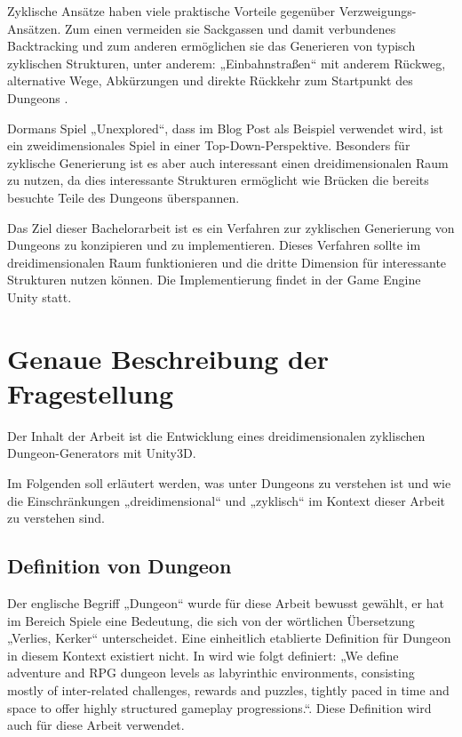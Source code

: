 Zyklische Ansätze haben viele praktische Vorteile gegenüber Verzweigungs-Ansätzen. Zum einen vermeiden sie Sackgassen und damit verbundenes Backtracking und zum anderen ermöglichen sie das Generieren von typisch zyklischen Strukturen, unter anderem: „Einbahnstraßen“ mit anderem Rückweg, alternative Wege, Abkürzungen und direkte Rückkehr zum Startpunkt des Dungeons 
\cite{blogCyclic}.

Dormans Spiel „Unexplored“, dass im Blog Post als Beispiel verwendet wird, ist ein zweidimensionales Spiel in einer Top-Down-Perspektive. Besonders für zyklische Generierung ist es aber auch interessant einen dreidimensionalen Raum zu nutzen, da dies interessante Strukturen ermöglicht wie Brücken die bereits besuchte Teile des Dungeons überspannen.  

Das Ziel dieser Bachelorarbeit ist es ein Verfahren zur zyklischen Generierung von Dungeons zu konzipieren und zu implementieren. Dieses Verfahren sollte im dreidimensionalen Raum funktionieren und die dritte Dimension für interessante Strukturen nutzen können. Die Implementierung findet in der Game Engine Unity statt.



\section{Genaue Beschreibung der Fragestellung}

Der Inhalt der Arbeit ist die Entwicklung eines dreidimensionalen zyklischen Dungeon-Generators mit Unity3D. 

Im Folgenden soll erläutert werden, was unter Dungeons zu verstehen ist und wie die Einschränkungen „dreidimensional“ und „zyklisch“ im Kontext dieser Arbeit zu verstehen sind.

\subsection{Definition von Dungeon}

Der englische Begriff „Dungeon“ wurde für diese Arbeit bewusst gewählt, er hat im Bereich Spiele eine Bedeutung, die sich von der wörtlichen Übersetzung „Verlies, Kerker“ unterscheidet. Eine einheitlich etablierte Definition für Dungeon in diesem Kontext existiert nicht. In \cite{proceduralGenerationOfDungeons} wird wie folgt definiert: „We define adventure and RPG dungeon levels as labyrinthic environments,  consisting  mostly  of  inter-related  challenges, rewards and puzzles, tightly paced in time and space to offer highly structured gameplay progressions.“. Diese Definition wird auch für diese Arbeit verwendet.

